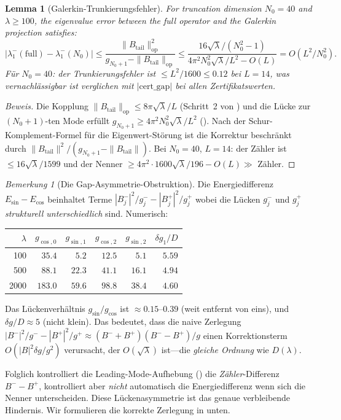 ﻿\documentclass[12pt,a4paper]{article}
\newtheorem{lemma}[theorem]{Lemma}
\theoremstyle{definition}
\theoremstyle{remark}
\newtheorem{remark}[theorem]{Bemerkung}
\begin{document}
\begin{lemma}[Galerkin-Trunkierungsfehler]
\label{lem:galerkin-error}
For truncation dimension $N_0 = 40$ and $\lambda \geq 100$, the eigenvalue error between the full operator and the Galerkin projection satisfies:
\[
  |\lambda_1^-(\mathrm{full}) - \lambda_1^-(N_0)|
  \leq \frac{\|B_{\mathrm{tail}}\|_{\mathrm{op}}^2}{g_{N_0+1} - \|B_{\mathrm{tail}}\|_{\mathrm{op}}}
  \leq \frac{16\sqrt{\lambda}/(N_0^2-1)}{4\pi^2 N_0^2\sqrt{\lambda}/L^2 - O(L)}
  = O(L^2/N_0^2).
\]
Für $N_0 = 40$: der Trunkierungsfehler ist $\leq L^2/1600 \leq 0.12$ bei $L = 14$, was vernachlässigbar ist verglichen mit $|\mathrm{cert\_gap}|$ bei allen Zertifikatswerten.
\end{lemma}
\begin{proof}[Beweis]
Die Kopplung $\|B_{\mathrm{tail}}\|_{\mathrm{op}} \leq 8\pi\sqrt{\lambda}/L$ (Schritt~2 von ) und die Lücke zur $(N_0+1)$-ten Mode erfüllt $g_{N_0+1} \geq 4\pi^2 N_0^2\sqrt{\lambda}/L^2$ (). Nach der Schur-Komplement-Formel für die Eigenwert-Störung ist die Korrektur beschränkt durch $\|B_{\mathrm{tail}}\|^2/(g_{N_0+1} - \|B_{\mathrm{tail}}\|)$. Bei $N_0 = 40$, $L = 14$: der Zähler ist $\leq 16\sqrt{\lambda}/1599$ und der Nenner $\geq 4\pi^2 \cdot 1600\sqrt{\lambda}/196 - O(L) \gg $ Zähler.
\end{proof}

\begin{remark}[Die Gap-Asymmetrie-Obstruktion]
\label{rem:gap-asymmetry}
Die Energiedifferenz $E_{\sin} - E_{\cos}$ beinhaltet Terme $|B_j^-|^2/g_j^- - |B_j^+|^2/g_j^+$ wobei die Lücken $g_j^-$ und $g_j^+$ \emph{strukturell unterschiedlich} sind. Numerisch:

\begin{center}
\small
\renewcommand{\arraystretch}{1.15}
\begin{tabular}{r|rr|rr|r}
$\lambda$ & $g_{\cos,0}$ & $g_{\sin,1}$ & $g_{\cos,2}$ & $g_{\sin,2}$ & $\delta g_1/D$ \\\hline
100  & $35.4$ & $5.2$  & $12.5$ & $5.1$  & $5.59$ \\
500  & $88.1$ & $22.3$ & $41.1$ & $16.1$ & $4.94$ \\
2000 & $183.0$ & $59.6$ & $98.8$ & $38.4$ & $4.60$
\end{tabular}
\end{center}

\noindent Das Lückenverhältnis $g_{\sin}/g_{\cos}$ ist $\approx 0.15$--$0.39$ (weit entfernt von eins), und $\delta g/D \approx 5$ (nicht klein). Das bedeutet, dass die naive Zerlegung $|B^-|^2/g^- - |B^+|^2/g^+ \approx (B^- + B^+)(B^- - B^+)/g$ einen Korrektionsterm $O(|B|^2 \delta g / g^2)$ verursacht, der $O(\sqrt{\lambda})$ ist---die \emph{gleiche Ordnung} wie $D(\lambda)$.

Folglich kontrolliert die Leading-Mode-Aufhebung () die \emph{Zähler}-Differenz $B^- - B^+$, kontrolliert aber \emph{nicht} automatisch die Energiedifferenz wenn sich die Nenner unterscheiden. Diese Lückenasymmetrie ist das genaue verbleibende Hindernis. Wir formulieren die korrekte Zerlegung in  unten.
\end{remark}
\end{document}
